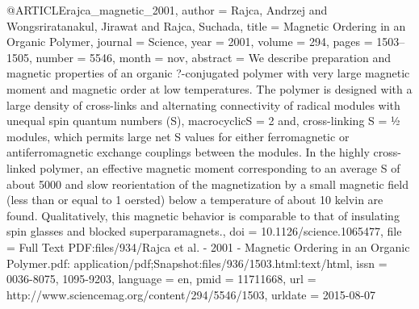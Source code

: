 @ARTICLE{rajca_magnetic_2001,
  author = {Rajca, Andrzej and Wongsriratanakul, Jirawat and Rajca, Suchada},
  title = {Magnetic {Ordering} in an {Organic} {Polymer}},
  journal = {Science},
  year = {2001},
  volume = {294},
  pages = {1503--1505},
  number = {5546},
  month = nov,
  abstract = {We describe preparation and magnetic properties of an organic ?-conjugated
	polymer with very large magnetic moment and magnetic order at low
	temperatures. The polymer is designed with a large density of cross-links
	and alternating connectivity of radical modules with unequal spin
	quantum numbers (S), macrocyclicS = 2 and, cross-linking S = ½ modules,
	which permits large net S values for either ferromagnetic or antiferromagnetic
	exchange couplings between the modules. In the highly cross-linked
	polymer, an effective magnetic moment corresponding to an average
	S of about 5000 and slow reorientation of the magnetization by a
	small magnetic field (less than or equal to 1 oersted) below a temperature
	of about 10 kelvin are found. Qualitatively, this magnetic behavior
	is comparable to that of insulating spin glasses and blocked superparamagnets.},
  doi = {10.1126/science.1065477},
  file = {Full Text PDF:files/934/Rajca et al. - 2001 - Magnetic Ordering in an Organic Polymer.pdf:      application/pdf;Snapshot:files/936/1503.html:text/html},
  issn = {0036-8075, 1095-9203},
  language = {en},
  pmid = {11711668},
  url = {http://www.sciencemag.org/content/294/5546/1503},
  urldate = {2015-08-07}
}

